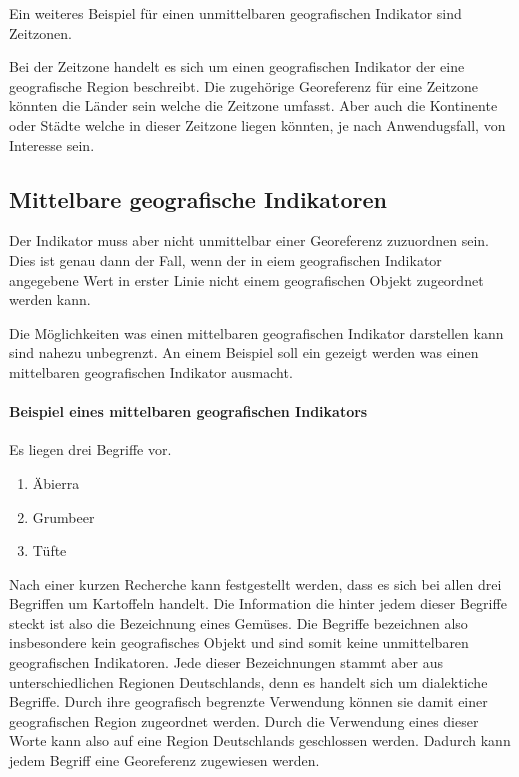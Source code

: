 				Ein weiteres Beispiel für einen unmittelbaren geografischen Indikator sind Zeitzonen.

				Bei der Zeitzone handelt es sich um einen geografischen Indikator der eine geografische Region beschreibt. 
				Die zugehörige Georeferenz für eine Zeitzone könnten die Länder sein welche die Zeitzone umfasst. 
				Aber auch die Kontinente oder Städte welche in dieser Zeitzone liegen könnten, je nach Anwendugsfall, von Interesse sein.


			\subsection{Mittelbare geografische Indikatoren} 

				Der Indikator muss aber nicht unmittelbar einer Georeferenz zuzuordnen sein.
				Dies ist genau dann der Fall, wenn der in eiem geografischen Indikator angegebene Wert in erster Linie nicht einem geografischen Objekt zugeordnet werden kann.
				
				Die Möglichkeiten was einen mittelbaren geografischen Indikator darstellen kann sind nahezu unbegrenzt. 
				An einem Beispiel soll ein gezeigt werden was einen mittelbaren geografischen Indikator ausmacht.
				
				\paragraph{Beispiel eines mittelbaren geografischen Indikators} 

				Es liegen drei Begriffe vor.
				\begin{enumerate}
				 	\item Äbierra
				 	\item Grumbeer
				 	\item Tüfte 
				 \end{enumerate} 

				Nach einer kurzen Recherche kann festgestellt werden, dass es sich bei allen drei Begriffen um Kartoffeln handelt.
				Die Information die hinter jedem dieser Begriffe steckt ist also die Bezeichnung eines Gemüses.
				Die Begriffe bezeichnen also insbesondere kein geografisches Objekt und sind somit keine unmittelbaren geografischen Indikatoren.
				Jede dieser Bezeichnungen stammt aber aus unterschiedlichen Regionen Deutschlands, denn es handelt sich um dialektiche Begriffe.
				Durch ihre geografisch begrenzte Verwendung können sie damit einer geografischen Region zugeordnet werden.
				Durch die Verwendung eines dieser Worte kann also auf eine Region Deutschlands geschlossen werden.
				Dadurch kann jedem Begriff eine Georeferenz zugewiesen werden.

